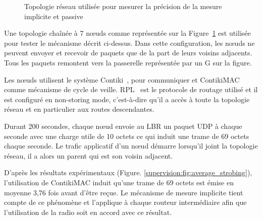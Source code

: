 \begin{figure}[ht]
  \centering

  \caption{Topologie réseau utilisée pour mesurer la précision de la mesure implicite et passive}

  \label{supervision:fig:topology_chain}
\end{figure}

Une topologie chaînée à 7 nœuds comme représentée sur la Figure~\ref{supervision:fig:topology_chain} est utilisée pour tester le mécanisme décrit ci-dessus.
Dans cette configuration, les nœuds ne peuvent envoyer et recevoir de  paquets que de la part de leurs voisins adjacents.
Tous les paquets remontent vers la passerelle représentée par un G sur la figure.

Les nœuds utilisent le système Contiki~\cite{dunkels2004contiki}, \ieee{} pour communiquer et ContikiMAC comme mécanisme de cycle de veille.
\ac{RPL}~\cite{rfc6550} est le protocole de routage utilisé et il est configuré en non-storing mode, c'est-à-dire qu'il a accès à toute la topologie réseau et en particulier aux routes descendantes.

Durant 200 secondes, chaque nœud envoie au \ac{LBR} un paquet \ac{UDP} à chaque seconde avec une charge utile de 10 octets ce qui induit une trame de 69 octets chaque seconde.
Le trafic applicatif d'un nœud démarre lorsqu'il joint la topologie réseau, il a alors un parent qui est son voisin adjacent.

D'après les résultats expérimentaux (Figure. \ref{supervision:fig:average_strobing}), l'utilisation de ContikiMAC induit qu'une trame de 69 octets est émise en moyenne 3,76 fois avant d'être reçue.
Le mécanisme de mesure implicite tient compte de ce phénomène et l'applique à chaque routeur intermédiaire afin que l'utilisation de la radio soit en accord avec ce résultat.

